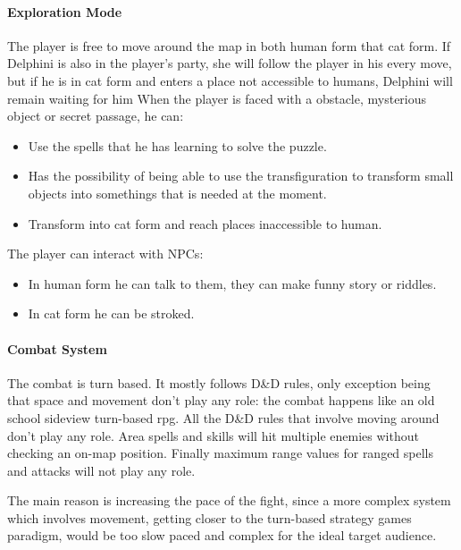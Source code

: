 \paragraph{Exploration Mode}

The player is free to move around  the map in both human form that cat form. If Delphini is also in the player's party, she will follow the player in his every move, but if he is in cat form and enters a place not accessible to humans, Delphini will remain waiting for him When the player is faced with a obstacle, mysterious object or secret passage, he can: 

\begin{itemize}
    \item Use the spells that he has learning to solve the puzzle.
    \item Has the possibility of being able to use the transfiguration to transform small objects into somethings that is needed at the moment.
    \item Transform into cat form and reach places inaccessible to human.
\end{itemize}

The player can interact with NPCs:

\begin{itemize}
    \item In human form he can talk to them, they can make funny story or riddles.
    \item In cat form he can be stroked.
\end{itemize}


\paragraph{Combat System}
The combat is turn based. It mostly follows D\&D rules, only exception being that space and movement don't play any role: the combat happens like an old school sideview turn-based rpg. All the D\&D rules that involve moving around don't play any role. Area spells and skills will hit multiple enemies without checking an on-map position. Finally maximum range values for ranged spells and attacks will not play any role.

The main reason is increasing the pace of the fight, since a more complex system which involves movement, getting closer to the turn-based strategy games paradigm, would be too slow paced and complex for the ideal target audience.

